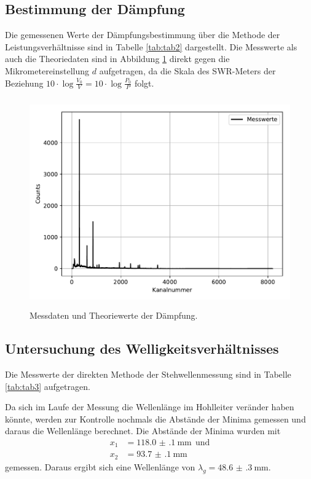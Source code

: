 \subsection{Bestimmung der Dämpfung}

Die gemessenen Werte der Dämpfungsbestimmung über die Methode der Leistungsverhältnisse sind
in Tabelle \ref{tab:tab2} dargestellt. Die Messwerte als auch die Theoriedaten sind in Abbildung \ref{fig:plot1}
direkt gegen die Mikrometereinstellung $d$ aufgetragen, da die Skala des SWR-Meters der Beziehung
$10\cdot\log\frac{V_0}{V}=10\cdot\log\frac{P_0}{P}$ folgt.



\begin{figure}
  \centering
  \includegraphics[height=9cm]{plot1.pdf}
  \caption{Messdaten und Theoriewerte der Dämpfung.}
  \label{fig:plot1}
\end{figure}

\subsection{Untersuchung des Welligkeitsverhältnisses}

Die Messwerte der direkten Methode der Stehwellenmessung sind in Tabelle \ref{tab:tab3} aufgetragen.

Da sich im Laufe der Messung die Wellenlänge im Hohlleiter veränder haben könnte, werden zur Kontrolle nochmals
die Abstände der Minima gemessen und daraus die Wellenlänge berechnet. Die Abstände der Minima wurden mit
\begin{align*}
  x_1&=\SI{118.0(1)}{\mm}\:\:\text{und}\\
  x_2&=\SI{93.7(1)}{\mm}
\end{align*}
gemessen.
Daraus ergibt sich eine Wellenlänge von $\lambda_g=\SI{48.6(3)}{\mm}$.\\


